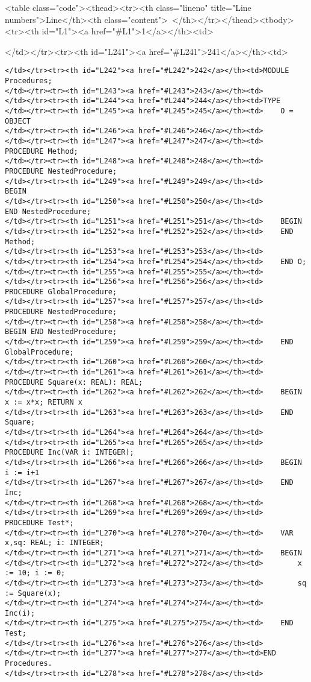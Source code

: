 <table class="code"><thead><tr><th class="lineno" title="Line numbers">Line</th><th class="content"> </th></tr></thead><tbody><tr><th id="L1"><a href="#L1">1</a></th><td>\documentclass[a4paper,11pt]{article}
\begin{document}
</td></tr><tr><th id="L241"><a href="#L241">241</a></th><td>\begin{lstlisting}[language=Oberon,frame=none,caption={Procedures}]
</td></tr><tr><th id="L242"><a href="#L242">242</a></th><td>MODULE Procedures;
</td></tr><tr><th id="L243"><a href="#L243">243</a></th><td>
</td></tr><tr><th id="L244"><a href="#L244">244</a></th><td>TYPE
</td></tr><tr><th id="L245"><a href="#L245">245</a></th><td>    O = OBJECT
</td></tr><tr><th id="L246"><a href="#L246">246</a></th><td>
</td></tr><tr><th id="L247"><a href="#L247">247</a></th><td>    PROCEDURE Method;
</td></tr><tr><th id="L248"><a href="#L248">248</a></th><td>        PROCEDURE NestedProcedure;
</td></tr><tr><th id="L249"><a href="#L249">249</a></th><td>        BEGIN
</td></tr><tr><th id="L250"><a href="#L250">250</a></th><td>        END NestedProcedure;
</td></tr><tr><th id="L251"><a href="#L251">251</a></th><td>    BEGIN
</td></tr><tr><th id="L252"><a href="#L252">252</a></th><td>    END Method;
</td></tr><tr><th id="L253"><a href="#L253">253</a></th><td>
</td></tr><tr><th id="L254"><a href="#L254">254</a></th><td>    END O;
</td></tr><tr><th id="L255"><a href="#L255">255</a></th><td>
</td></tr><tr><th id="L256"><a href="#L256">256</a></th><td>    PROCEDURE GlobalProcedure;
</td></tr><tr><th id="L257"><a href="#L257">257</a></th><td>        PROCEDURE NestedProcedure;
</td></tr><tr><th id="L258"><a href="#L258">258</a></th><td>        BEGIN END NestedProcedure;
</td></tr><tr><th id="L259"><a href="#L259">259</a></th><td>    END GlobalProcedure;
</td></tr><tr><th id="L260"><a href="#L260">260</a></th><td>
</td></tr><tr><th id="L261"><a href="#L261">261</a></th><td>    PROCEDURE Square(x: REAL): REAL;
</td></tr><tr><th id="L262"><a href="#L262">262</a></th><td>    BEGIN x := x*x; RETURN x
</td></tr><tr><th id="L263"><a href="#L263">263</a></th><td>    END Square;
</td></tr><tr><th id="L264"><a href="#L264">264</a></th><td>
</td></tr><tr><th id="L265"><a href="#L265">265</a></th><td>    PROCEDURE Inc(VAR i: INTEGER);
</td></tr><tr><th id="L266"><a href="#L266">266</a></th><td>    BEGIN i := i+1
</td></tr><tr><th id="L267"><a href="#L267">267</a></th><td>    END Inc;
</td></tr><tr><th id="L268"><a href="#L268">268</a></th><td>
</td></tr><tr><th id="L269"><a href="#L269">269</a></th><td>    PROCEDURE Test*;
</td></tr><tr><th id="L270"><a href="#L270">270</a></th><td>    VAR x,sq: REAL; i: INTEGER;
</td></tr><tr><th id="L271"><a href="#L271">271</a></th><td>    BEGIN
</td></tr><tr><th id="L272"><a href="#L272">272</a></th><td>        x := 10; i := 0;
</td></tr><tr><th id="L273"><a href="#L273">273</a></th><td>        sq := Square(x);
</td></tr><tr><th id="L274"><a href="#L274">274</a></th><td>        Inc(i);
</td></tr><tr><th id="L275"><a href="#L275">275</a></th><td>    END Test;
</td></tr><tr><th id="L276"><a href="#L276">276</a></th><td>
</td></tr><tr><th id="L277"><a href="#L277">277</a></th><td>END Procedures.
</td></tr><tr><th id="L278"><a href="#L278">278</a></th><td>\end{lstlisting}
\end{document}

